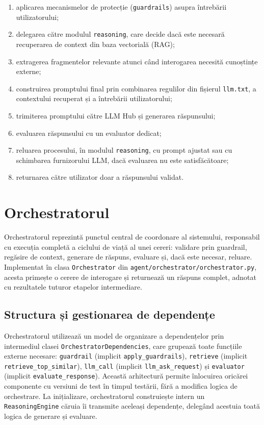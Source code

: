 \documentclass[12pt, a4paper, oneside, romanian]{teza-upb}
\begin{document}
\begin{enumerate}
    \item aplicarea mecanismelor de protecție (\texttt{guardrails}) asupra întrebării utilizatorului;
    \item delegarea către modulul \texttt{reasoning}, care decide dacă este necesară recuperarea de context din baza vectorială (RAG);
    \item extragerea fragmentelor relevante atunci când interogarea necesită cunoștințe externe;
    \item construirea promptului final prin combinarea regulilor din fișierul \texttt{llm.txt}, a contextului recuperat și a întrebării utilizatorului;
    \item trimiterea promptului către LLM Hub și generarea răspunsului;
    \item evaluarea răspunsului cu un evaluator dedicat;
    \item reluarea procesului, în modulul \texttt{reasoning}, cu prompt ajustat sau cu schimbarea furnizorului LLM, dacă evaluarea nu este satisfăcătoare;
    \item returnarea către utilizator doar a răspunsului validat.
\end{enumerate}


\section{Orchestratorul}

Orchestratorul reprezintă punctul central de coordonare al sistemului, responsabil cu execuția completă a ciclului de viață al unei cereri: validare prin guardrail, regăsire de context, generare de răspuns, evaluare și, dacă este necesar, reluare. Implementat în clasa \texttt{Orchestrator} din \texttt{agent/orchestrator/orchestrator.py}, acesta primește o cerere de interogare și returnează un răspuns complet, adnotat cu rezultatele tuturor etapelor intermediare.


\subsection{Structura și gestionarea de dependențe}

Orchestratorul utilizează un model de organizare a dependențelor prin intermediul 
clasei \texttt{OrchestratorDependencies}, care grupează toate funcțiile externe necesare: \texttt{guardrail} (implicit \texttt{apply\_guardrails}), \texttt{retrieve} (implicit \texttt{retrieve\_top\_similar}), \texttt{llm\_call} (implicit \texttt{llm\_ask\_request}) și \texttt{evaluator} (implicit \texttt{evaluate\_response}). Această arhitectură permite înlocuirea oricărei componente cu versiuni de test în timpul testării, fără a modifica logica de orchestrare. La inițializare, orchestratorul construiește intern un \texttt{ReasoningEngine} căruia îi transmite aceleași dependențe, delegând acestuia toată logica de generare și evaluare.
\end{document}
